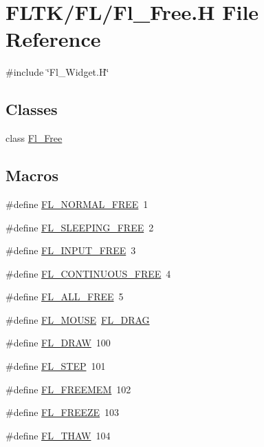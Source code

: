 \hypertarget{_fl___free_8_h}{}\section{F\+L\+T\+K/\+F\+L/\+Fl\+\_\+\+Free.H File Reference}
\label{_fl___free_8_h}
{\ttfamily \#include \char`\"{}Fl\+\_\+\+Widget.\+H\char`\"{}}\newline
\subsection*{Classes}
\begin{DoxyCompactItemize}
\item 
class \hyperlink{class_fl___free}{Fl\+\_\+\+Free}
\end{DoxyCompactItemize}
\subsection*{Macros}
\begin{DoxyCompactItemize}
\item 
\#define \hyperlink{_fl___free_8_h_a255be05c257bb908b06668140a164bab}{F\+L\+\_\+\+N\+O\+R\+M\+A\+L\+\_\+\+F\+R\+EE}~1
\item 
\#define \hyperlink{_fl___free_8_h_a782d108df8ed470e2fc73fe76371cd9f}{F\+L\+\_\+\+S\+L\+E\+E\+P\+I\+N\+G\+\_\+\+F\+R\+EE}~2
\item 
\#define \hyperlink{_fl___free_8_h_afe06dcda6b1b1513c131f1ca9699d15e}{F\+L\+\_\+\+I\+N\+P\+U\+T\+\_\+\+F\+R\+EE}~3
\item 
\#define \hyperlink{_fl___free_8_h_a94db6deb30a313b9e56c3b8538475743}{F\+L\+\_\+\+C\+O\+N\+T\+I\+N\+U\+O\+U\+S\+\_\+\+F\+R\+EE}~4
\item 
\#define \hyperlink{_fl___free_8_h_a9f8f96c96fe37a5056586225f4585079}{F\+L\+\_\+\+A\+L\+L\+\_\+\+F\+R\+EE}~5
\item 
\#define \hyperlink{_fl___free_8_h_a747a575b4eb4c5dd5e8fdd4eeddefbf1}{F\+L\+\_\+\+M\+O\+U\+SE}~\hyperlink{_enumerations_8_h_ad16daf120d9a0501cccaee563af0b9a3aaad5c7b2302d7bfe6c6d37b50b4c70f0}{F\+L\+\_\+\+D\+R\+AG}
\item 
\#define \hyperlink{_fl___free_8_h_a637fcff9eb0ade128f6cd7b19599d311}{F\+L\+\_\+\+D\+R\+AW}~100
\item 
\#define \hyperlink{_fl___free_8_h_adef8de2ef6d61f3db852cc5245e6ccac}{F\+L\+\_\+\+S\+T\+EP}~101
\item 
\#define \hyperlink{_fl___free_8_h_aacc1f67b3188eacb5a334490d2a4b298}{F\+L\+\_\+\+F\+R\+E\+E\+M\+EM}~102
\item 
\#define \hyperlink{_fl___free_8_h_add9724fac75da918bf16b12a04120ba8}{F\+L\+\_\+\+F\+R\+E\+E\+ZE}~103
\item 
\#define \hyperlink{_fl___free_8_h_a0128dd928352bace747d7afbca1ab22b}{F\+L\+\_\+\+T\+H\+AW}~104
\end{DoxyCompactItemize}
